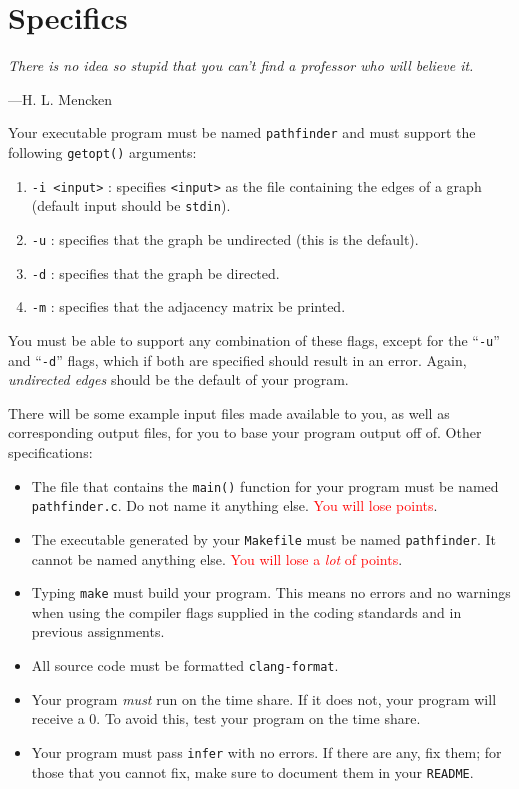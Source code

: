 \documentclass[11pt]{article}
\begin{document}
\section{Specifics}
\textwidth \epigraph{\emph{There is no idea so stupid that
you can't find a professor who will believe it.}} {---H. L. Mencken}

Your executable program must be named \texttt{pathfinder} and must support the
following \texttt{getopt()} arguments:

\begin{enumerate}
    \item \texttt{-i <input>} : specifies \texttt{<input>} as the file
        containing the edges of a graph (default input should be
        \texttt{stdin}).
    \item \texttt{-u} : specifies that the graph be undirected (this is the
        default).
    \item \texttt{-d} : specifies that the graph be directed.
    \item \texttt{-m} : specifies that the adjacency matrix be printed.
\end{enumerate}

You must be able to support any combination of these flags, except for the
``\texttt{-u}'' and ``\texttt{-d}'' flags, which if both are specified should result in an error.
Again, \emph{undirected edges} should be the default of your program.

There will be some example input files made available to you, as well as
corresponding output files, for you to base your program output off of. Other
specifications:

\begin{itemize}
\item The file that contains the \texttt{main()} function for your program must
    be named \texttt{pathfinder.c}. Do not name it anything else.
    \textcolor{red}{You will lose points}.
\item The executable generated by your \texttt{Makefile} must be named
    \texttt{pathfinder}. It cannot be named anything else. \textcolor{red}{You
    will lose a \emph{lot} of points}.
\item Typing \texttt{make} must build your program. This means no errors and no
    warnings when using the compiler flags supplied in the coding standards and
    in previous assignments.
\item All source code must be formatted \texttt{clang-format}.
\item Your program \emph{must} run on the time share. If it does not, your
    program will receive a 0. To avoid this, test your program on the time
    share.
\item Your program must pass \texttt{infer} with no errors. If there are any,
    fix them; for those that you cannot fix, make sure to document them in your
    \texttt{README}.
\end{itemize}
\end{document}
